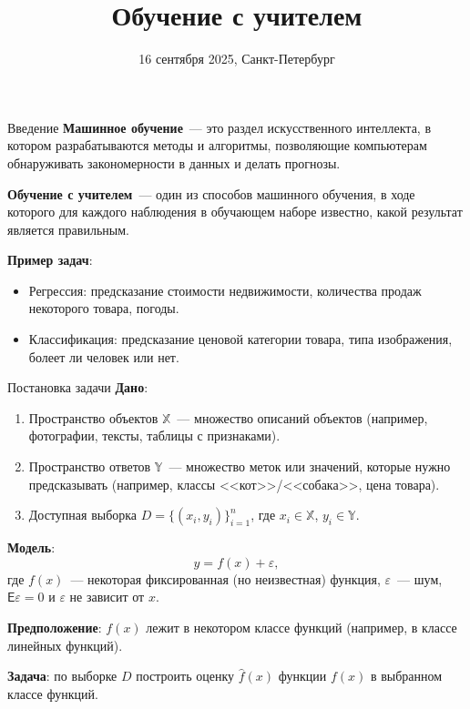 \documentclass[notheorems, handout]{beamer}
\title[Статистическое и машинное обучение]{Обучение с учителем}
\institute[Санкт-Петербургский Государственный Университет]{%
  \small
  Санкт-Петербургский государственный университет\\
  Кафедра статистического моделирования
}
\date{16 сентября 2025, Санкт-Петербург}
\begin{document}
\begin{frame}
  \titlepage
\end{frame}

\begin{frame}{Введение}
  \textbf{Машинное обучение}~--- это раздел искусственного
  интеллекта, в котором разрабатываются методы и алгоритмы,
  позволяющие компьютерам обнаруживать закономерности в данных и
  делать прогнозы.\medskip

  \textbf{Обучение с учителем}~--- один из способов машинного
  обучения, в ходе которого для каждого наблюдения в обучающем наборе
  известно, какой результат является правильным.\medskip

  \textbf{Пример задач}:
  \begin{itemize}
    \item Регрессия: предсказание стоимости недвижимости, количества
      продаж некоторого товара, погоды.
    \item Классификация: предсказание ценовой категории товара, типа
      изображения, болеет ли человек или нет.
  \end{itemize}
\end{frame}

\begin{frame}{Постановка задачи}
  \textbf{Дано}:
  \begin{enumerate}
    \item Пространство объектов $\mathbb{X}$~--- множество описаний
      объектов (например, фотографии, тексты, таблицы с признаками).
    \item Пространство ответов $\mathbb{Y}$~--- множество меток или
      значений, которые нужно предсказывать (например, классы
      <<кот>>/<<собака>>, цена товара).
    \item Доступная выборка $D = \{(x_i, y_i)\}_{i=1}^n$, где $x_i\in
      \mathbb{X}$, $y_i\in \mathbb{Y}$.
  \end{enumerate}
  \textbf{Модель}:
  \[
    y=f(x) + \varepsilon,
  \]
  где $f(x)$~--- некоторая фиксированная (но неизвестная) функция,
  $\varepsilon$~--- шум, $\mathsf{E}\varepsilon=0$ и $\varepsilon$ не
  зависит от $x$.\medskip

  \textbf{Предположение}: $f(x)$ лежит в некотором классе функций
  (например, в классе линейных функций).\medskip

  \textbf{Задача}: по выборке $D$ построить оценку $\hat f(x)$
  функции $f(x)$ в выбранном классе функций.
\end{frame}
\end{document}

